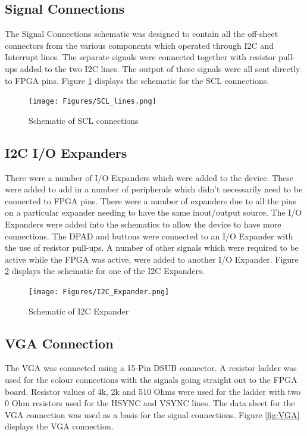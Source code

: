 \subsection{Signal Connections}

	The Signal Connections schematic was designed to contain all the off-sheet connectors from the various components which operated through I2C and Interrupt lines. 
The separate signals were connected together with resistor pull-ups added to the two I2C lines. 
The output of these signals were all sent directly to FPGA pins. 
Figure \ref{fig:SCL} displays the schematic for the SCL connections. 

\begin{figure}
	\texttt{[image: Figures/SCL\_lines.png]}\centering
	\caption{Schematic of SCL connections}
	\label{fig:SCL}
\end{figure}


\subsection{I2C I/O Expanders}

	There were a number of I/O Expanders which were added to the device. These were added to add in a number of peripherals which didn't necessarily need to be connected to FPGA pins. There were a number of expanders due to all the pins on a particular expander needing to have the same inout/output source. 
The I/O Expanders were added into the schematics to allow the device to have more connections. The DPAD and buttons were connected to an I/O Expander with the use of resistor pull-ups. A number of other signals which were required to be active while the FPGA was active, were added to another I/O Expander.
Figure \ref{fig:I2C} displays the schematic for one of the I2C Expanders. 

\begin{figure}
	\texttt{[image: Figures/I2C\_Expander.png]}\centering
	\caption{Schematic of I2C Expander}
	\label{fig:I2C}
\end{figure}

\subsection{VGA Connection}
\label{chap:VGA}

	The VGA was connected using a 15-Pin DSUB connector. 
A resistor ladder was used for the colour connections with the signals going straight out to the FPGA board.
Resistor values of 4k, 2k and 510 Ohms were used for the ladder with two 0 Ohm resistors used for the HSYNC and VSYNC lines. 
The data sheet for the VGA connection was used as a basis for the signal connections. 
Figure \ref{fig:VGA} displays the VGA connection. 

